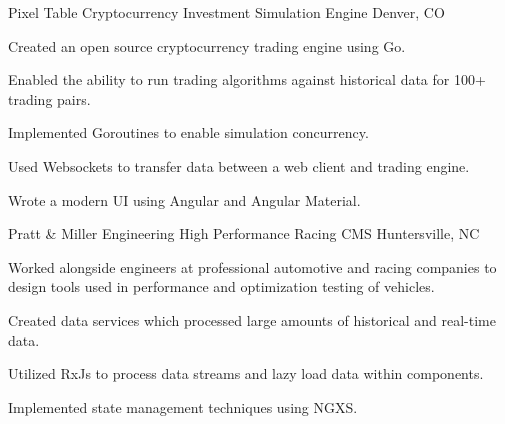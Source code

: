 

\begin{cventries}

    \cventry
    {Pixel Table} %
    {Cryptocurrency Investment Simulation Engine} %
    {Denver, CO} %
    {} %
    {
    \begin{cvitems} %
        \item {Created an open source cryptocurrency trading engine using Go.}
        \item {Enabled the ability to run trading algorithms against historical data for 100+ trading pairs.}
        \item {Implemented Goroutines to enable simulation concurrency.}
        \item {Used Websockets to transfer data between a web client and trading engine.}
        \item {Wrote a modern UI using Angular and Angular Material.}
    \end{cvitems}
    }

    \cventry
    {Pratt \& Miller Engineering} %
    {High Performance Racing CMS} %
    {Huntersville, NC} %
    {} %
    {
    \begin{cvitems} %
        \item {Worked alongside engineers at professional automotive and racing companies to design tools used in performance and optimization testing of vehicles.}
        \item {Created data services which processed large amounts of historical and real-time data.}
        \item {Utilized RxJs to process data streams and lazy load data within components.}
        \item {Implemented state management techniques using NGXS.}
    \end{cvitems}
    }


\end{cventries}
